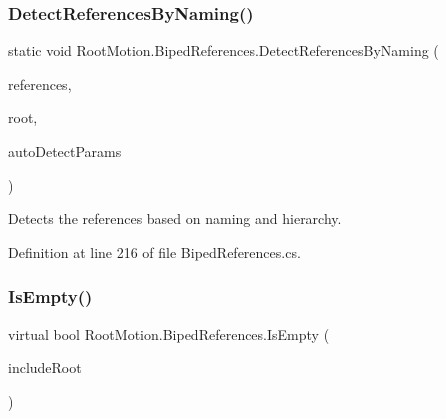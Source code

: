 \mbox{\label{class_root_motion_1_1_biped_references_a60c9580a2af294063ead6b0b8f6a0360}} 
\subsubsection{\texorpdfstring{Detect\+References\+By\+Naming()}{DetectReferencesByNaming()}}
{\footnotesize\ttfamily static void Root\+Motion.\+Biped\+References.\+Detect\+References\+By\+Naming (\begin{DoxyParamCaption}\item[{ref \mbox{\hyperlink{class_root_motion_1_1_biped_references}{Biped\+References}}}]{references,  }\item[{Transform}]{root,  }\item[{\mbox{\hyperlink{struct_root_motion_1_1_biped_references_1_1_auto_detect_params}{Auto\+Detect\+Params}}}]{auto\+Detect\+Params }\end{DoxyParamCaption})\hspace{0.3cm}{\ttfamily [static]}}



Detects the references based on naming and hierarchy. 



Definition at line 216 of file Biped\+References.\+cs.

\mbox{\label{class_root_motion_1_1_biped_references_a9b09e3a8851e9b5709571de3895fc24c}} 
\subsubsection{\texorpdfstring{Is\+Empty()}{IsEmpty()}}
{\footnotesize\ttfamily virtual bool Root\+Motion.\+Biped\+References.\+Is\+Empty (\begin{DoxyParamCaption}\item[{bool}]{include\+Root }\end{DoxyParamCaption})\hspace{0.3cm}{\ttfamily [virtual]}}



